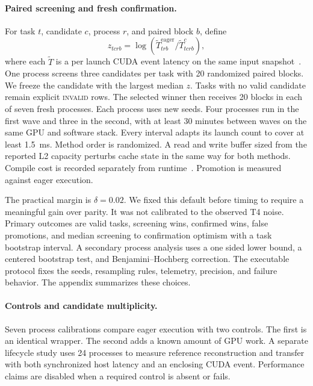 \paragraph{Paired screening and fresh confirmation.}
For task $t$, candidate $c$, process $r$, and paired block $b$, define
\begin{equation}
z_{tcrb}=\log(\widetilde T^{\mathrm{eager}}_{trb}/
\widetilde T^{c}_{tcrb}),
\end{equation}
where each $\widetilde T$ is a per launch CUDA event latency on the same input
snapshot~\citep{nvidiaCudaEvents}. One process screens three candidates per task
with 20 randomized paired blocks. We freeze the candidate with the largest
median $z$. Tasks with no valid candidate remain explicit \textsc{invalid} rows.
The selected winner then receives 20 blocks in each of seven fresh processes.
Each process uses new seeds. Four processes run in the first wave and three in
the second, with at least 30 minutes between waves on the same GPU and software
stack. Every interval adapts its launch count to cover at least 1.5~ms. Method
order is randomized. A read and write buffer sized from the reported L2 capacity
perturbs cache state in the same way for both methods. Compile cost is recorded
separately from runtime~\citep{ansel2024pytorch2}. Promotion is measured against
eager execution.

The practical margin is $\delta=0.02$. We fixed this default before timing to
require a meaningful gain over parity. It was not calibrated to the observed T4
noise. Primary outcomes are valid tasks, screening wins, confirmed wins, false
promotions, and median screening to confirmation optimism with a task bootstrap
interval. A secondary process analysis uses a one sided lower bound, a centered
bootstrap test, and Benjamini--Hochberg correction. The executable protocol fixes
the seeds, resampling rules, telemetry, precision, and failure behavior. The
appendix summarizes these choices.

\paragraph{Controls and candidate multiplicity.}
Seven process calibrations compare eager execution with two controls. The first
is an identical wrapper. The second adds a known amount of GPU work. A separate
lifecycle study uses 24 processes to measure reference reconstruction and
transfer with both synchronized host latency and an enclosing CUDA event.
Performance claims are disabled when a required control is absent or fails.

